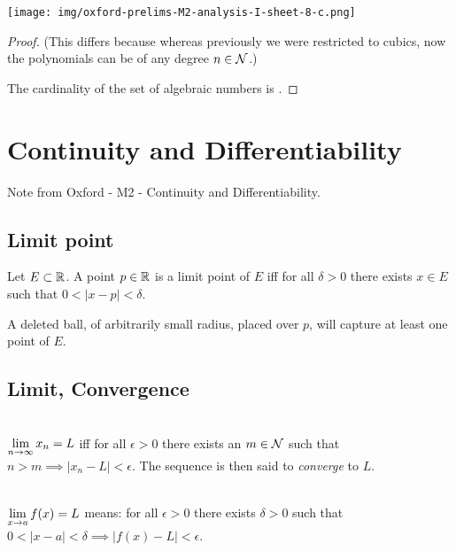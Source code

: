 \begin{enumerate}
  \begin{mdframed}
    \texttt{[image: img/oxford-prelims-M2-analysis-I-sheet-8-c.png]}
  \end{mdframed}

  \begin{proof}
    (This differs because whereas previously we were restricted to cubics, now the polynomials can
    be of any degree $n \in \N$.)

    The cardinality of the set of algebraic numbers is .
  \end{proof}
\end{enumerate}


\newpage

\section{Continuity and Differentiability}
Note from Oxford - M2 - Continuity and Differentiability.

\subsection{Limit point}
\begin{definition*}
Let $E \subset \R$. A point $p \in \R$ is a limit point of $E$ iff for all $\delta > 0$ there
exists $x \in E$ such that $0 < |x - p| < \delta$.
\end{definition*}
\begin{intuition*}
  A deleted ball, of arbitrarily small radius, placed over $p$, will capture at least one point of
  $E$.
\end{intuition*}

\subsection{Limit, Convergence}

\begin{definition*}~\\
$\LimEq{x_n}{L}{n}{\infty}$ iff for all $\epsilon > 0$ there exists an $m \in \N$ such that
$n > m \implies |x_n - L| < \epsilon$. The sequence is then said to \textit{converge} to $L$.
\end{definition*}

\begin{definition*}~\\
$\LimEq{f(x)}{L}{x}{a}$ means: for all $\epsilon > 0$ there exists $\delta > 0$ such that
$0 < |x - a| < \delta \implies |f(x) - L| < \epsilon$.
\end{definition*}

